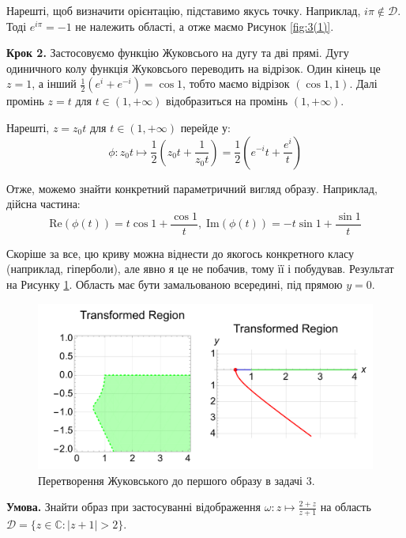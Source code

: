 \documentclass[oneside,solution]{karazin-complan-assign}
\begin{document}
Нарешті, щоб визначити орієнтацію, підставимо якусь точку. Наприклад, $i\pi \notin \mathcal{D}$. Тоді $e^{i\pi}=-1$ не належить області, а отже маємо Рисунок \ref{fig:3(1)}. 

\textbf{Крок 2.} Застосовуємо функцію Жуковсього на дугу та дві прямі. Дугу одиничного колу функція Жуковсього переводить на відрізок. Один кінець це $z=1$, а інший $\frac{1}{2}(e^i+e^{-i})=\cos 1$, тобто маємо відрізок $(\cos 1, 1)$. Далі промінь $z=t$ для $t \in (1,+\infty)$ відобразиться на промінь $(1,+\infty)$. 

Нарешті, $z=z_0t$ для $t \in (1,+\infty)$ перейде у:
\begin{equation}
    \phi: z_0t \mapsto \frac{1}{2}\left(z_0t + \frac{1}{z_0t}\right) = \frac{1}{2}\left(e^{-i}t + \frac{e^i}{t}\right)
\end{equation}

Отже, можемо знайти конкретний параметричний вигляд образу. Наприклад, дійсна частина:
\begin{equation}
    \text{Re}(\phi(t)) = t \cos 1 + \frac{\cos 1}{t}, \; \text{Im}(\phi(t)) = -t \sin 1 + \frac{\sin 1}{t}
\end{equation}

Скоріше за все, цю криву можна віднести до якогось конкретного класу (наприклад, гіперболи), але явно я це не побачив, тому її і побудував. Результат на Рисунку \ref{fig:3(2)}. Область має бути замальованою всередині, під прямою $y=0$.

\begin{figure}
    \centering
    \includegraphics[width=\textwidth]{images/test_2/plot_3_2.pdf}
    \caption{Перетворення Жуковського до першого образу в задачі 3.}
    \label{fig:3(2)}
\end{figure}


\hspace{20px}\textbf{Умова.} Знайти образ при застосуванні відображення $\omega: z \mapsto \frac{2+z}{z+1}$ на область $\mathcal{D} = \{z \in \mathbb{C}: |z+1|>2\}$.
\end{document}
